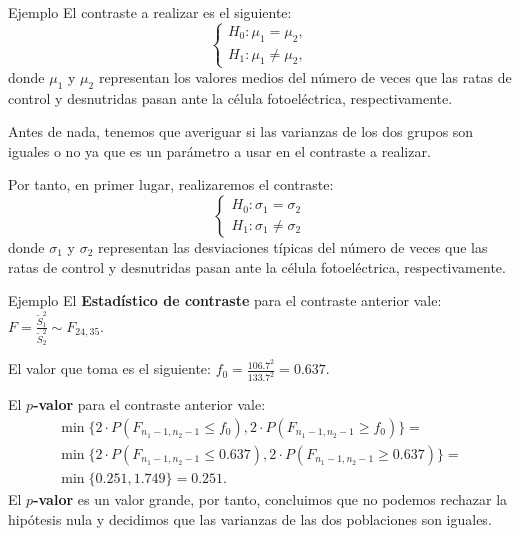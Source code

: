 \documentclass[
  ignorenonframetext,
]{beamer}
\begin{document}
\begin{frame}{Ejemplo}
\protect\hypertarget{ejemplo-53}{}
El contraste a realizar es el siguiente: \[
\left\{\begin{array}{l}
H_0:\mu_1=\mu_2,\\
H_1:\mu_1\neq \mu_2,
\end{array}\right.
\] donde \(\mu_1\) y \(\mu_2\) representan los valores medios del número
de veces que las ratas de control y desnutridas pasan ante la célula
fotoeléctrica, respectivamente.

Antes de nada, tenemos que averiguar si las varianzas de los dos grupos
son iguales o no ya que es un parámetro a usar en el contraste a
realizar.

Por tanto, en primer lugar, realizaremos el contraste: \[
\left\{\begin{array}{l}
H_0:\sigma_1=\sigma_2\\
H_1:\sigma_1\neq \sigma_2
\end{array}\right.
\] donde \(\sigma_1\) y \(\sigma_2\) representan las desviaciones
típicas del número de veces que las ratas de control y desnutridas pasan
ante la célula fotoeléctrica, respectivamente.
\end{frame}

\begin{frame}{Ejemplo}
\protect\hypertarget{ejemplo-54}{}
El \textbf{Estadístico de contraste} para el contraste anterior vale:
\(F=\frac{\widetilde{S}_1^2}{\widetilde{S}_2^2}\sim F_{24,35}.\)

El valor que toma es el siguiente:
\(f_0=\frac{106.7^2}{133.7^2}=0.637.\)

El \textbf{\(p\)-valor} para el contraste anterior vale: \[
\begin{array}{l}
\min\{2\cdot P(F_{n_1-1,n_2-1}\leq f_0),2\cdot P(F_{n_1-1,n_2-1}\geq f_0)\}= \\
\min\{2\cdot P(F_{n_1-1,n_2-1}\leq 0.637),2\cdot P(F_{n_1-1,n_2-1}\geq 0.637)\} 
= \\ \min\{0.251,1.749\}=0.251.
\end{array}
\] El \textbf{\(p\)-valor} es un valor grande, por tanto, concluimos que
no podemos rechazar la hipótesis nula y decidimos que las varianzas de
las dos poblaciones son iguales.
\end{frame}
\end{document}
